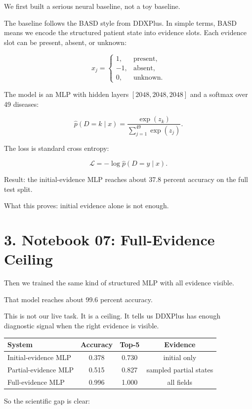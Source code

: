 \documentclass[11pt]{article}
\begin{document}
We first built a serious neural baseline, not a toy baseline.

The baseline follows the BASD style from DDXPlus. In simple terms, BASD means we encode the structured patient state into evidence slots. Each evidence slot can be present, absent, or unknown:

\[
x_j =
\begin{cases}
1, & \text{present},\\
-1, & \text{absent},\\
0, & \text{unknown}.
\end{cases}
\]

The model is an MLP with hidden layers $[2048, 2048, 2048]$ and a softmax over 49 diseases:

\[
\hat{p}(D=k\mid x)=\frac{\exp(z_k)}{\sum_{j=1}^{49}\exp(z_j)}.
\]

The loss is standard cross entropy:

\[
\mathcal{L}=-\log \hat{p}(D=y\mid x).
\]

Result: the initial-evidence MLP reaches about 37.8 percent accuracy on the full test split.

What this proves: initial evidence alone is not enough.

\section*{3. Notebook 07: Full-Evidence Ceiling}

Then we trained the same kind of structured MLP with all evidence visible.

That model reaches about 99.6 percent accuracy.

This is not our live task. It is a ceiling. It tells us DDXPlus has enough diagnostic signal when the right evidence is visible.

\begin{table}[H]
\centering
\begin{tabular}{lccc}
\toprule
System & Accuracy & Top-5 & Evidence \\
\midrule
Initial-evidence MLP & 0.378 & 0.730 & initial only \\
Partial-evidence MLP & 0.515 & 0.827 & sampled partial states \\
Full-evidence MLP & 0.996 & 1.000 & all fields \\
\bottomrule
\end{tabular}
\end{table}

So the scientific gap is clear:
\end{document}
